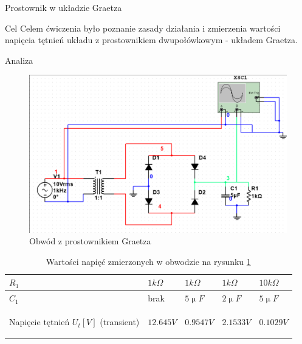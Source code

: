 \documentclass[a4paper]{scrartcl}
\begin{document}
	\begin{section}{Prostownik w układzie Graetza}
		\begin{subsection}{Cel}
			Celem ćwiczenia było poznanie zasady działania i zmierzenia wartości napięcia tętnień układu z prostownikiem dwupołówkowym - układem Graetza.
		\end{subsection}
		\begin{subsection}{Analiza}
				\begin{figure}[ht]
				\begin{center}
					\includegraphics[width=0.5\linewidth,scale=2]{exercise-3-circuit}
					\caption{Obwód z prostownikiem Graetza}
					\label{fig:circuit-3}
				\end{center}
				\end{figure}

				\begin{table}[ht]
					\begin{center}
					\caption{Wartości napięć zmierzonych w obwodzie na rysunku \ref{fig:circuit-3} }
					\label{table:circuit-3}
					\begin{tabular}{| >{\bfseries}p{4.5cm} | l | l | l | l |}
						\hline
						$ R_{1} $ & $ 1k\Omega $ & $ 1k\Omega $ & $ 1k\Omega $ & $ 10k\Omega $ \\ \hline
						$ C_{1} $ & brak & $5 \upmu F$ & $2 \upmu F$ & $5\upmu F$ \\ \hline \hline
					
						Napięcie tętnień $U_{t} [V] $ (transient)  & $ 12.645V $ & $ 0.9547V $ & $ 2.1533V $ & $ 0.1029V $\\ \hline



\end{tabular}
\end{center}
\end{table}
\end{subsection}
\end{section}
\end{document}
